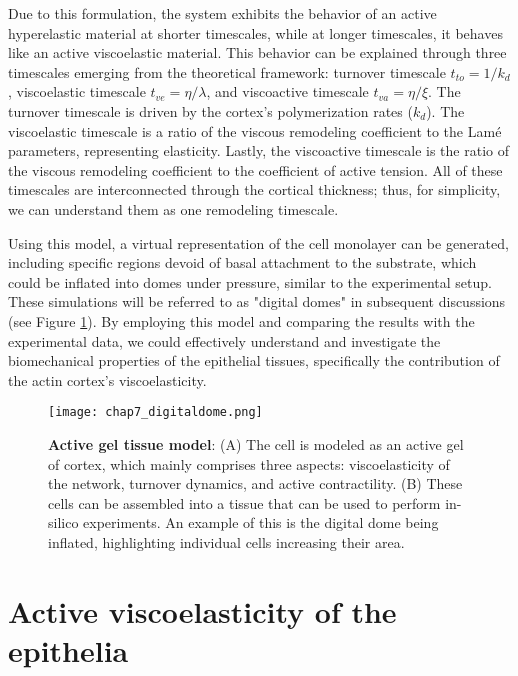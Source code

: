 Due to this formulation, the system exhibits the behavior of an active
hyperelastic material at shorter timescales, while at longer timescales,
it behaves like an active viscoelastic material. This behavior can be
explained through three timescales emerging from the theoretical
framework: turnover timescale \(t_{to} = 1/k_{d}\), viscoelastic
timescale \(t_{ve} = \eta/\lambda\), and viscoactive timescale
\(t_{va} = \eta/\xi\). The turnover timescale is driven by the cortex's
polymerization rates (\(k_{d}\)). The viscoelastic timescale is a ratio
of the viscous remodeling coefficient to the Lamé parameters,
representing elasticity. Lastly, the viscoactive timescale is the ratio
of the viscous remodeling coefficient to the coefficient of active
tension. All of these timescales are interconnected through the cortical
thickness; thus, for simplicity, we can understand them as one
remodeling timescale.

Using this model, a virtual representation of the cell monolayer can be
generated, including specific regions devoid of basal attachment to the
substrate, which could be inflated into domes under pressure, similar to
the experimental setup. These simulations will be referred to as
"digital domes" in subsequent discussions (see Figure \ref{fig_7_2}).
By employing this model and comparing
the results with the experimental data, we could effectively understand
and investigate the biomechanical properties of the epithelial tissues,
specifically the contribution of the actin cortex's viscoelasticity.

\begin{figure}[]
	\centering
	\texttt{[image: chap7\_digitaldome.png]}
	\caption{\label{fig_7_2} \textbf{Active gel tissue model}: (A) The cell is modeled as an active gel of cortex, which mainly comprises three aspects: viscoelasticity of the network, turnover dynamics, and active contractility. (B) These cells can be assembled into a tissue that can be used to perform in-silico experiments. An example of this is the digital dome being inflated, highlighting individual cells increasing their area.}
\end{figure}

\hypertarget{active-viscoelasticity-of-the-epithelia}{%
	\section{Active viscoelasticity of the
		epithelia}\label{active-viscoelasticity-of-the-epithelia}}
	

